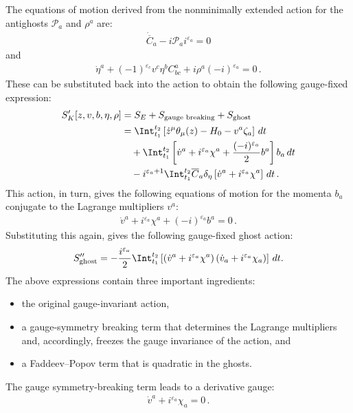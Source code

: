     The equations of motion derived from the nonminimally extended action for the antighosts $\mathcal{P}_a$ and $\rho^a$ are:
    \begin{gather}
        \dot{\overline{C}}_a -i\mathcal{P}_ai^{\varepsilon_a}=0
    \end{gather}
    and
    \begin{gather}
        \dot{\eta}^a + (-1)^{\varepsilon_c}v^c\eta^bC^a_{bc}+i\rho^a(-i)^{\varepsilon_a}=0\,.
    \end{gather}
    These can be substituted back into the action to obtain the following gauge-fixed expression:
    \begin{gather}
        \label{constraint:FP_action}
        \begin{aligned}
            S'_K[z,v,b,\eta,\rho] &= S_E + S_{\text{gauge breaking}} + S_{\text{ghost}}\\
            &= \Int_{t_1}^{t_2}\left[\dot{z}^\mu\theta_\mu(z) - H_0 - v^a\zeta_a\right]\,dt\\
            &\quad+ \Int_{t_1}^{t_2}\left[\dot{v}^a+i^{\varepsilon_a}\chi^a+\frac{(-i)^{\varepsilon_a}}{2}b^a\right]b_a\,dt\\
            &\quad -i^{\varepsilon_a+1}\Int_{t_1}^{t_2}\overline{C}_a\delta_\eta\left[\dot{v}^a+i^{\varepsilon_a}\chi^a\right]\,dt\,.
        \end{aligned}
    \end{gather}
    This action, in turn, gives the following equations of motion for the momenta $b_a$ conjugate to the Lagrange multipliers $v^a$:
    \begin{gather}
        \dot{v}^a+i^{\varepsilon_a}\chi^a+(-i)^{\varepsilon_a}b^a = 0\,.
    \end{gather}
    Substituting this again, gives the following gauge-fixed ghost action:
    \begin{gather}
        S''_{\text{ghost}} = -\frac{i^{\varepsilon_a}}{2}\Int_{t_1}^{t_2}\left[\left(\dot{v}^a + i^{\varepsilon_a}\chi^a\right)\left(\dot{v}_a + i^{\varepsilon_a}\chi_a\right)\right]\,dt.
    \end{gather}
    The above expressions contain three important ingredients:
    \begin{itemize}
        \item the original gauge-invariant action,
        \item a gauge-symmetry breaking term that determines the Lagrange multipliers and, accordingly, freezes the gauge invariance of the action, and
        \item a Faddeev--Popov term that is quadratic in the ghosts.
    \end{itemize}
    The gauge symmetry-breaking term leads to a derivative gauge:
    \begin{gather}
        \label{constraint:derivative_gauge}
        \dot{v}^a + i^{\varepsilon_a}\chi_a = 0\,.
    \end{gather}

